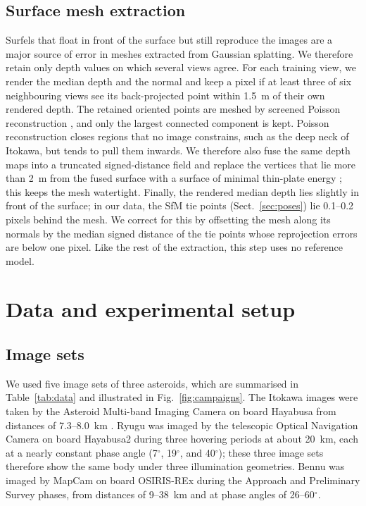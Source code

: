 \documentclass[fleqn,usenatbib]{aa}
\begin{document}
\subsection{Surface mesh extraction}
\label{sec:extraction}

Surfels that float in front of the surface but still reproduce the images are a major source of error in meshes
extracted from Gaussian splatting. We therefore retain only depth values on which several views agree. For each
training view, we render the median depth and the normal and keep a pixel if at least three of six neighbouring views
see its back-projected point within 1.5~m of their own rendered depth. The retained oriented points are meshed by
screened Poisson reconstruction \citep{Kazhdan2013}, and only the largest connected component is kept. Poisson
reconstruction closes regions that no image constrains, such as the deep neck of Itokawa, but tends to pull them
inwards. We therefore also fuse the same depth maps into a truncated signed-distance field \citep{Curless1996} and replace the
vertices that lie more than 2~m from the fused surface with a surface of minimal thin-plate energy
\citep[mesh fairing;][]{Botsch2004}; this keeps the mesh watertight. Finally, the rendered median depth lies slightly
in front of the surface; in our data, the SfM tie points (Sect.~\ref{sec:poses}) lie 0.1--0.2 pixels behind the mesh.
We correct for this by offsetting the mesh along its normals by the median signed distance of the tie points whose
reprojection errors are below one pixel. Like the rest of the extraction, this step uses no reference model.

\section{Data and experimental setup}
\label{sec:setup}

\subsection{Image sets}
\label{sec:images}

We used five image sets of three asteroids, which are summarised in Table~\ref{tab:data} and illustrated in
Fig.~\ref{fig:campaigns}. The Itokawa images were taken by the Asteroid Multi-band Imaging Camera
\citep[AMICA;][]{Ishiguro2010} on board Hayabusa from distances of 7.3--8.0~km \citep{Saito2006}. Ryugu was imaged by the telescopic Optical Navigation Camera \citep[ONC-T;][]{Kameda2017} on board Hayabusa2 during
three hovering periods at about 20~km, each at a nearly constant phase angle (7$^\circ$, 19$^\circ$, and
40$^\circ$); these three image sets therefore show the same body under three illumination geometries. Bennu was imaged by MapCam \citep{Rizk2018} on board OSIRIS-REx during the Approach and Preliminary Survey phases, from distances of 9--38~km and
at phase angles of 26--60$^\circ$.
\end{document}
